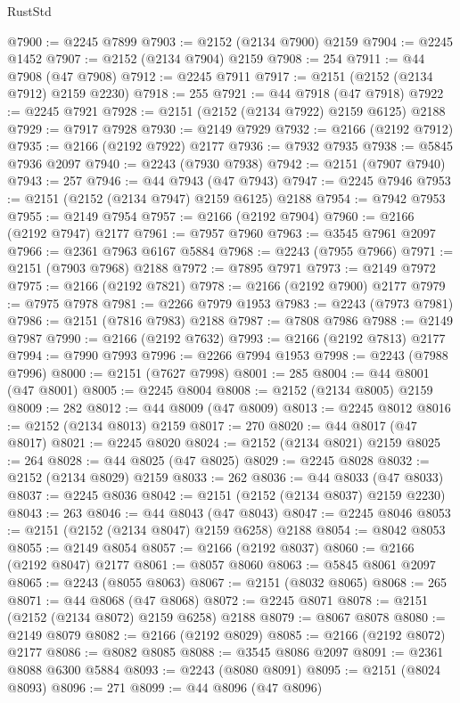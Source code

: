 \begin{lexlean}{RustStd}
\begin{coremodule}
@7900 := @2245 @7899
@7903 := @2152 (@2134 @7900) @2159
@7904 := @2245 @1452
@7907 := @2152 (@2134 @7904) @2159
@7908 := 254
@7911 := @44 @7908 (@47 @7908)
@7912 := @2245 @7911
@7917 := @2151 (@2152 (@2134 @7912) @2159 @2230)
@7918 := 255
@7921 := @44 @7918 (@47 @7918)
@7922 := @2245 @7921
@7928 := @2151 (@2152 (@2134 @7922) @2159 @6125) @2188
@7929 := @7917 @7928
@7930 := @2149 @7929
@7932 := @2166 (@2192 @7912)
@7935 := @2166 (@2192 @7922) @2177
@7936 := @7932 @7935
@7938 := @5845 @7936 @2097
@7940 := @2243 (@7930 @7938)
@7942 := @2151 (@7907 @7940)
@7943 := 257
@7946 := @44 @7943 (@47 @7943)
@7947 := @2245 @7946
@7953 := @2151 (@2152 (@2134 @7947) @2159 @6125) @2188
@7954 := @7942 @7953
@7955 := @2149 @7954
@7957 := @2166 (@2192 @7904)
@7960 := @2166 (@2192 @7947) @2177
@7961 := @7957 @7960
@7963 := @3545 @7961 @2097
@7966 := @2361 @7963 @6167 @5884
@7968 := @2243 (@7955 @7966)
@7971 := @2151 (@7903 @7968) @2188
@7972 := @7895 @7971
@7973 := @2149 @7972
@7975 := @2166 (@2192 @7821)
@7978 := @2166 (@2192 @7900) @2177
@7979 := @7975 @7978
@7981 := @2266 @7979 @1953
@7983 := @2243 (@7973 @7981)
@7986 := @2151 (@7816 @7983) @2188
@7987 := @7808 @7986
@7988 := @2149 @7987
@7990 := @2166 (@2192 @7632)
@7993 := @2166 (@2192 @7813) @2177
@7994 := @7990 @7993
@7996 := @2266 @7994 @1953
@7998 := @2243 (@7988 @7996)
@8000 := @2151 (@7627 @7998)
@8001 := 285
@8004 := @44 @8001 (@47 @8001)
@8005 := @2245 @8004
@8008 := @2152 (@2134 @8005) @2159
@8009 := 282
@8012 := @44 @8009 (@47 @8009)
@8013 := @2245 @8012
@8016 := @2152 (@2134 @8013) @2159
@8017 := 270
@8020 := @44 @8017 (@47 @8017)
@8021 := @2245 @8020
@8024 := @2152 (@2134 @8021) @2159
@8025 := 264
@8028 := @44 @8025 (@47 @8025)
@8029 := @2245 @8028
@8032 := @2152 (@2134 @8029) @2159
@8033 := 262
@8036 := @44 @8033 (@47 @8033)
@8037 := @2245 @8036
@8042 := @2151 (@2152 (@2134 @8037) @2159 @2230)
@8043 := 263
@8046 := @44 @8043 (@47 @8043)
@8047 := @2245 @8046
@8053 := @2151 (@2152 (@2134 @8047) @2159 @6258) @2188
@8054 := @8042 @8053
@8055 := @2149 @8054
@8057 := @2166 (@2192 @8037)
@8060 := @2166 (@2192 @8047) @2177
@8061 := @8057 @8060
@8063 := @5845 @8061 @2097
@8065 := @2243 (@8055 @8063)
@8067 := @2151 (@8032 @8065)
@8068 := 265
@8071 := @44 @8068 (@47 @8068)
@8072 := @2245 @8071
@8078 := @2151 (@2152 (@2134 @8072) @2159 @6258) @2188
@8079 := @8067 @8078
@8080 := @2149 @8079
@8082 := @2166 (@2192 @8029)
@8085 := @2166 (@2192 @8072) @2177
@8086 := @8082 @8085
@8088 := @3545 @8086 @2097
@8091 := @2361 @8088 @6300 @5884
@8093 := @2243 (@8080 @8091)
@8095 := @2151 (@8024 @8093)
@8096 := 271
@8099 := @44 @8096 (@47 @8096)

\end{coremodule}
\end{lexlean}
